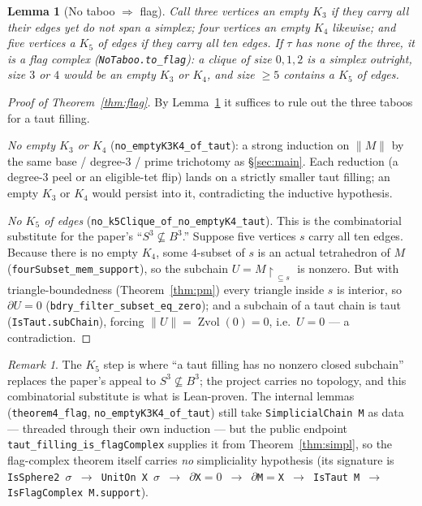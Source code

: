 \documentclass[11pt]{article}
\theoremstyle{plain}
\newtheorem{lemma}[theorem]{Lemma}
\theoremstyle{definition}
\theoremstyle{remark}
\newtheorem*{remark}{Remark}
\newcommand{\Zvol}{\operatorname{Zvol}}
\newcommand{\bd}{\partial}
\newcommand{\code}[1]{\texttt{#1}}
\newcommand{\norm}[1]{\lVert #1\rVert}
\begin{document}
\begin{lemma}[No taboo $\Rightarrow$ flag]\label{lem:notaboo}
Call three vertices an \emph{empty $K_3$} if they carry all their edges yet do not span a
simplex; four vertices an \emph{empty $K_4$} likewise; and five vertices a \emph{$K_5$ of edges}
if they carry all ten edges. If $\tau$ has none of the three, it is a flag complex
(\code{NoTaboo.to\_flag}): a clique of size $0,1,2$ is a simplex outright, size $3$ or $4$ would
be an empty $K_3$ or $K_4$, and size $\ge 5$ contains a $K_5$ of edges.
\end{lemma}

\begin{proof}[Proof of Theorem~\ref{thm:flag}]
By Lemma~\ref{lem:notaboo} it suffices to rule out the three taboos for a taut filling.

\emph{No empty $K_3$ or $K_4$} (\code{no\_emptyK3K4\_of\_taut}): a strong induction on $\norm M$
by the same base / degree-$3$ / prime trichotomy as \S\ref{sec:main}. Each reduction (a
degree-$3$ peel or an eligible-tet flip) lands on a strictly smaller taut filling; an empty
$K_3$ or $K_4$ would persist into it, contradicting the inductive hypothesis.

\emph{No $K_5$ of edges} (\code{no\_k5Clique\_of\_no\_emptyK4\_taut}). This is the combinatorial
substitute for the paper's ``$S^3\not\subseteq B^3$.'' Suppose five vertices $s$ carry all ten
edges. Because there is no empty $K_4$, some $4$-subset of $s$ is an actual tetrahedron of $M$
(\code{fourSubset\_mem\_support}), so the subchain $U=M\!\restriction_{\,\subseteq s}$ is
nonzero. But with triangle-boundedness (Theorem~\ref{thm:pm}) every triangle inside $s$ is
interior, so $\bd U=0$ (\code{bdry\_filter\_subset\_eq\_zero}); and a subchain of a taut chain is
taut (\code{IsTaut.subChain}), forcing $\norm U=\Zvol(0)=0$, i.e.\ $U=0$ --- a contradiction.
\end{proof}

\begin{remark}
The $K_5$ step is where ``a taut filling has no nonzero closed subchain'' replaces the paper's
appeal to $S^3\not\subseteq B^3$; the project carries no topology, and this combinatorial
substitute is what is Lean-proven. The internal lemmas (\code{theorem4\_flag},
\code{no\_emptyK3K4\_of\_taut}) still take \code{SimplicialChain M} as data --- threaded through
their own induction --- but the public endpoint \code{taut\_filling\_is\_flagComplex} supplies it
from Theorem~\ref{thm:simpl}, so the flag-complex theorem itself carries \emph{no} simpliciality
hypothesis (its signature is \code{IsSphere2 $\sigma$ $\to$ UnitOn X $\sigma$ $\to$ $\bd$X${=}0$
$\to$ $\bd$M${=}$X $\to$ IsTaut M $\to$ IsFlagComplex M.support}).
\end{remark}
\end{document}
